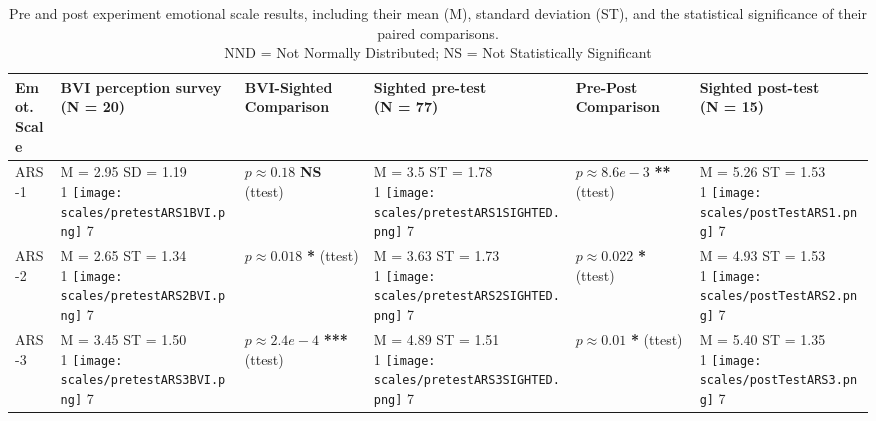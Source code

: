 \documentclass{vgtc}                          %
\begin{document}
\begin{table*}[t]
\caption{Pre and post experiment emotional scale results, including their mean (M), standard deviation (ST), and the statistical significance of their paired comparisons. \\ 
NND = Not Normally Distributed; NS = Not Statistically Significant}

\label{resultsTable}
\begin{tabular} {l|l|l|l|l|l}

\thead{\textbf{Emot.}\\ \textbf{Scale}}
& \thead{\textbf{BVI perception survey} \\ (N = 20)}
& \thead{BVI-Sighted\\Comparison}
& \thead{\textbf{Sighted pre-test} \\ (N = 77)}
& \thead{Pre-Post\\Comparison}
& \thead{\textbf{Sighted post-test} \\  (N = 15)}  \\
\hline\hline

ARS-1  & 
\thead{M = 2.95 SD = 1.19 \\ 1 \texttt{[image: scales/pretestARS1BVI.png]} 7
}  
& \thead{$p \approx 0.18$  \\ \textbf{NS} (ttest) } %
& \thead{M = 3.5  ST = 1.78 \\ 1 \texttt{[image: scales/pretestARS1SIGHTED.png]} 7
}
& \thead{$p \approx 8.6e-3$  \\ \textbf{**} (ttest) }
&
\thead{M = 5.26  ST = 1.53 \\ 1 \texttt{[image: scales/postTestARS1.png]} 7
}    \\ \hline

ARS-2 &
\thead{M = 2.65  ST = 1.34 \\ 1 \texttt{[image: scales/pretestARS2BVI.png]} 7
}  
& \thead{$p \approx 0.018$ \\ \textbf{*} (ttest) } %
& \thead{M = 3.63  ST = 1.73 \\ 1 \texttt{[image: scales/pretestARS2SIGHTED.png]} 7}  
& \thead{$p \approx 0.022$  \\ \textbf{*} (ttest) }
&  \thead{M = 4.93  ST = 1.53 \\ 1 \texttt{[image: scales/postTestARS2.png]} 7
}    \\ \hline

ARS-3 &
\thead{M = 3.45  ST = 1.50 \\ 1 \texttt{[image: scales/pretestARS3BVI.png]} 7
} 
& \thead{$p \approx 2.4e-4$ \\ \textbf{***} (ttest)} 
& \thead{M = 4.89  ST = 1.51 \\ 1 \texttt{[image: scales/pretestARS3SIGHTED.png]} 7}   
& \thead{$p \approx 0.01$  \\ \textbf{*} (ttest) }
&  \thead{M = 5.40 ST = 1.35 \\ 1 \texttt{[image: scales/postTestARS3.png]} 7
}    \\ \hline


\end{tabular}
\end{table*}
\end{document}

